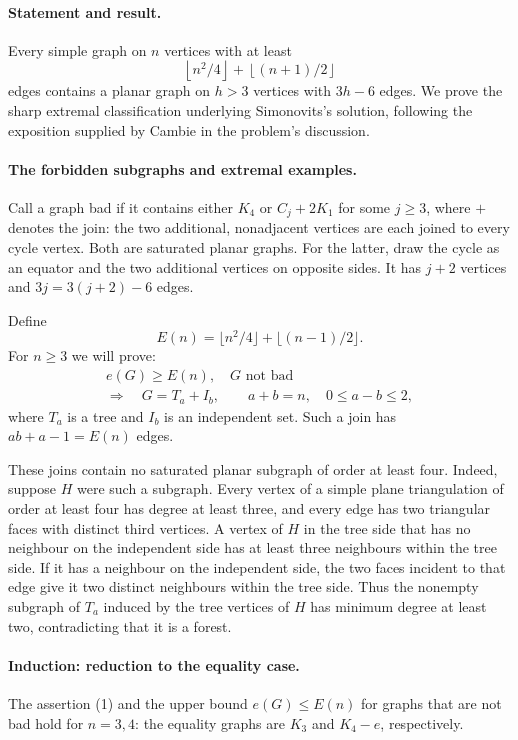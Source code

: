 \paragraph{Statement and result.}
Every simple graph on \(n\) vertices with at least
\[
 \left\lfloor n^2/4\right\rfloor+
 \left\lfloor(n+1)/2\right\rfloor
\]
edges contains a planar graph on \(h>3\) vertices with \(3h-6\) edges. We prove the sharp extremal classification underlying Simonovits's solution, following the exposition supplied by Cambie in the problem's discussion.

\paragraph{The forbidden subgraphs and extremal examples.}
Call a graph bad if it contains either \(K_4\) or \(C_j+2K_1\) for some \(j\geq3\), where \(+\) denotes the join: the two additional, nonadjacent vertices are each joined to every cycle vertex. Both are saturated planar graphs. For the latter, draw the cycle as an equator and the two additional vertices on opposite sides. It has \(j+2\) vertices and \(3j=3(j+2)-6\) edges.

Define
\[
 E(n)=\lfloor n^2/4\rfloor+\lfloor(n-1)/2\rfloor.
\]
For \(n\geq3\) we will prove:
\[
 \begin{gathered}
 e(G)\geq E(n),\quad G\text{ not bad}\\
 \Longrightarrow\quad
 G=T_a+I_b,\qquad a+b=n,\quad 0\leq a-b\leq2,
 \tag{1}
 \end{gathered}
\]
where \(T_a\) is a tree and \(I_b\) is an independent set. Such a join has \(ab+a-1=E(n)\) edges.

These joins contain no saturated planar subgraph of order at least four. Indeed, suppose \(H\) were such a subgraph. Every vertex of a simple plane triangulation of order at least four has degree at least three, and every edge has two triangular faces with distinct third vertices. A vertex of \(H\) in the tree side that has no neighbour on the independent side has at least three neighbours within the tree side. If it has a neighbour on the independent side, the two faces incident to that edge give it two distinct neighbours within the tree side. Thus the nonempty subgraph of \(T_a\) induced by the tree vertices of \(H\) has minimum degree at least two, contradicting that it is a forest.

\paragraph{Induction: reduction to the equality case.}
The assertion (1) and the upper bound \(e(G)\leq E(n)\) for graphs that are not bad hold for \(n=3,4\): the equality graphs are \(K_3\) and \(K_4-e\), respectively.

